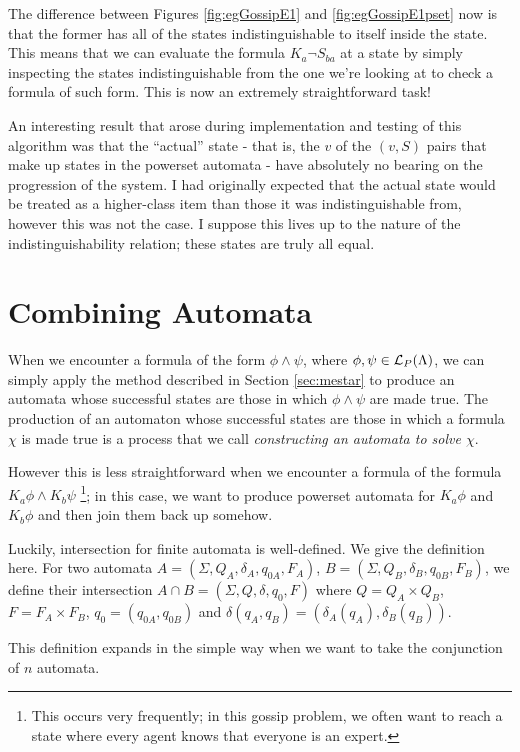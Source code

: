 \documentclass[10pt, a4paper]{report}
\begin{document}
The difference between Figures \ref{fig:egGossipE1} and \ref{fig:egGossipE1pset}
now is that the former has all of the states indistinguishable to itself inside
the state. This means that we can evaluate the formula $K_a \neg S_{ba}$ at a
state by simply inspecting the states indistinguishable from the one we're
looking at to check a formula of such form. This is now an extremely
straightforward task! 

An interesting result that arose during implementation and testing of this
algorithm was that the ``actual'' state - that is, the $v$ of the $(v, S)$ pairs
that make up states in the powerset automata - have absolutely no bearing on the
progression of the system. I had originally expected that the actual state would
be treated as a higher-class item than those it was indistinguishable from,
however this was not the case. I suppose this lives up to the nature of the
indistinguishability relation; these states are truly all equal. 

\section{Combining Automata}

When we encounter a formula of the form $\phi \land \psi$, where $\phi, \psi \in
\mathcal{L}_P(\Lambda)$, we can simply apply the method described in Section
\ref{sec:mestar} to produce an automata whose successful states are those in
which $\phi \land \psi$ are made true. The production of an automaton whose
successful states are those in which a formula $\chi$ is made true is a process
that we call \emph{constructing an automata to solve $\chi$}.

However this is less straightforward when we encounter a formula of the formula
$K_a \phi \land K_b \psi$ \footnote{This occurs very frequently; in this gossip
  problem, we often want to reach a state where every agent knows that everyone
  is an expert.}; in this case, we want to produce powerset automata for $K_a
\phi$ and $K_b \phi$ and then join them back up somehow.

Luckily, intersection for finite automata is well-defined. We give the
definition here. For two automata $A = (\Sigma, Q_A, \delta_A, q_{0A}, F_A)$, $B
= (\Sigma, Q_B, \delta_B, q_{0B}, F_B)$, we define their intersection $A \cap B =
(\Sigma, Q, \delta, q_0, F)$ where $Q = Q_A \times Q_B$, $F = F_A \times F_B$,
$q_0 = (q_{0A}, q_{0B})$ and $\delta(q_A, q_B) = (\delta_A(q_A), \delta_B(q_B))$.

This definition expands in the simple way when we want to take the conjunction
of $n$ automata. 
\end{document}
